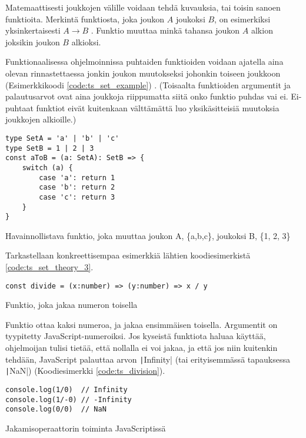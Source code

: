 Matemaattisesti joukkojen välille voidaan tehdä kuvauksia, tai toisin sanoen funktioita. Merkintä funktiosta, joka  joukon $A$ joukoksi $B$, on esimerkiksi yksinkertaisesti $A \to B$ \cite{mellin2005joukkooppi}. Funktio muuttaa minkä tahansa joukon $A$ alkion joksikin joukon $B$ alkioksi.

Funktionaalisessa ohjelmoinnissa puhtaiden funktioiden voidaan ajatella aina olevan rinnastettaessa jonkin joukon muutokseksi johonkin toiseen joukkoon (Esimerkkikoodi \ref{code:ts_set_example}) \cite{bartosz_category_for_progamers}. (Toisaalta funktioiden argumentit ja palautusarvot ovat aina joukkoja riippumatta siitä onko funktio puhdas vai ei. Ei-puhtaat funktiot eivät kuitenkaan välttämättä luo yksikäsitteisiä muutoksia joukkojen alkioille.)

\begin{code}
    \begin{verbatim}
type SetA = 'a' | 'b' | 'c'
type SetB = 1 | 2 | 3
const aToB = (a: SetA): SetB => {
    switch (a) {
        case 'a': return 1
        case 'b': return 2
        case 'c': return 3
    }
}  
\end{verbatim}
    \caption{Havainnollistava funktio, joka muuttaa joukon A, \{a,b,c\}, joukoksi B, \{1, 2, 3\}}
    \label{code:ts_set_example}
\end{code}

Tarkastellaan konkreettisempaa esimerkkiä lähtien koodiesimerkistä \ref{code:ts_set_theory_3}.

\begin{code}
    \begin{verbatim}
const divide = (x:number) => (y:number) => x / y
\end{verbatim}
    \caption{Funktio, joka jakaa numeron toisella}
    \label{code:ts_set_theory_3}
\end{code}



Funktio ottaa kaksi numeroa, ja jakaa ensimmäisen toisella. Argumentit on tyypitetty JavaScript-numeroiksi. Jos kyseistä funktiota haluaa käyttää, ohjelmoijan tulisi tietää, että nollalla ei voi jakaa, ja että jos niin kuitenkin tehdään, JavaScript palauttaa arvon \texttt|Infinity| (tai erityisemmässä tapauksessa \texttt|NaN|) (Koodiesimerkki \ref{code:ts_division}).


\begin{code}
    \begin{verbatim}
console.log(1/0)  // Infinity
console.log(1/-0) // -Infinity
console.log(0/0)  // NaN
\end{verbatim}
    \caption{Jakamisoperaattorin toiminta JavaScriptissä}
    \label{code:ts_division}
\end{code}

